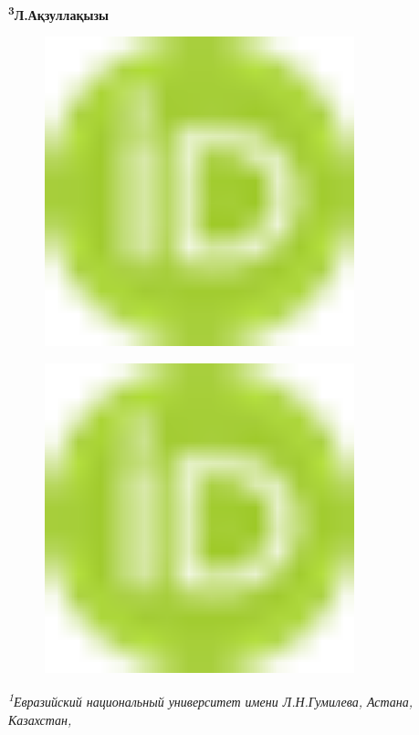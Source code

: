 {\bfseries \textsuperscript{3}Л.Ақзуллақызы}
\begin{figure}[H]
	\centering
	\includegraphics[width=0.8\textwidth]{media/ict/image1}
	\caption*{}
\end{figure}

\begin{figure}[H]
	\centering
	\includegraphics[width=0.8\textwidth]{media/ict/image1}
	\caption*{}
\end{figure}


\emph{\textsuperscript{1}Евразийский национальный университет имени
Л.Н.Гумилева, Астана, Казахстан,}

